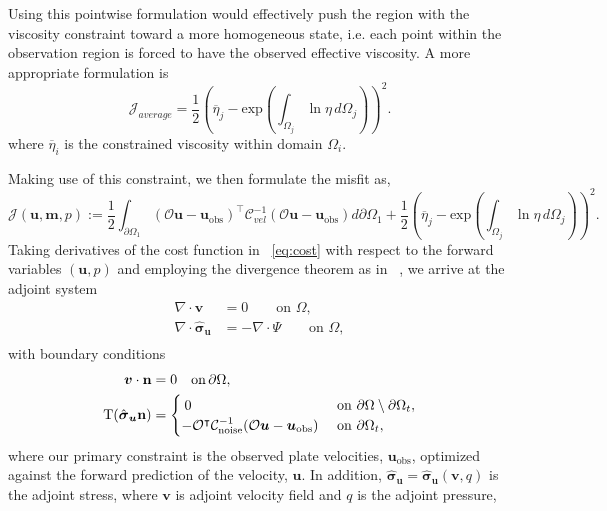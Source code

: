 \documentclass[12pt]{article}
\newcommand{\mm}{{\ensuremath{\boldsymbol{m}}}}
\newcommand{\uu}{{\ensuremath{\boldsymbol{u}}}}
\newcommand{\vv}{{\ensuremath{\boldsymbol{v}}}}
\newcommand{\ssigma}{{\ensuremath{\boldsymbol{\sigma}}}}
\begin{document}
{Using this pointwise formulation would effectively push the region with the viscosity constraint toward a more homogeneous state, i.e. each point within the observation region is forced to have the observed effective viscosity. A more appropriate formulation is
\begin{equation}
 \mathcal{J}_{average}=\frac{1}{2}(\overline{\eta}_j - \text{exp}({\int_{\Omega_j} \ln \eta \,d\Omega_j}))^{2}.
\end{equation}
where $\overline{\eta}_i$ is the constrained viscosity within domain $\Omega_i$.

Making use of this constraint, we then formulate the misfit as,
\begin{equation}
  \mathcal{J}(\uu,\mm,p):= \frac{1}{2}\int_{\partial \Omega_1} (\mathcal{O}\uu-\uu_{\text{obs}})^\intercal\mathcal{C}^{-1}_{vel}(\mathcal{O}\uu-\uu_{\text{obs}})d\partial\Omega_1 
   +\frac{1}{2}(\overline{\eta}_j - \text{exp}({\int_{\Omega_j} \ln \eta \, d\Omega_j}))^{2}.
\label{eq:cost}
\end{equation}
Taking derivatives of the cost function in ~\eqref{eq:cost} with respect to the forward variables $(\uu,p)$ and employing the divergence theorem as in ~\citep{ratnaswamy2015adjoint}, we arrive at
the adjoint system
\begin{equation}
  \label{eq:adjoint}
  \begin{split}
    \nabla \cdot \vv &=0 \qquad  \text{on } \Omega, \\
    \nabla \cdot \hat \ssigma_\uu&=-\nabla \cdot \Psi   \qquad \text{on } \Omega, \\
  \end{split}
\end{equation}
with boundary conditions
\begin{align*}
  \vv\cdot \textbf{n}&=0 \quad \text{on} \, \partial \Omega, \\
  \boldmath{\mathrm{T}}(\hat\ssigma_\uu \textbf{n})
  &=\begin{cases} \:0 & \text{ on }\partial \Omega\setminus
  \partial\Omega_t, \\
  -\mathcal{O}^\intercal\mathcal{C}^{-1}_{\text{noise}}(\mathcal O \uu-\uu_{\text{obs}}) &\text{ on }
  \partial\Omega_t,
  \end{cases}
  \label{eq:adjoint}
\end{align*}
where our primary constraint is the observed plate velocities, $\uu_{\text{obs}}$, optimized against the forward prediction of the velocity, $\uu$. In addition, $\hat\ssigma_\uu = \hat\ssigma_\uu(\vv,q)$ is the adjoint stress, where $\vv$ is adjoint velocity field and $q$ is the adjoint pressure,
}
\end{document}
